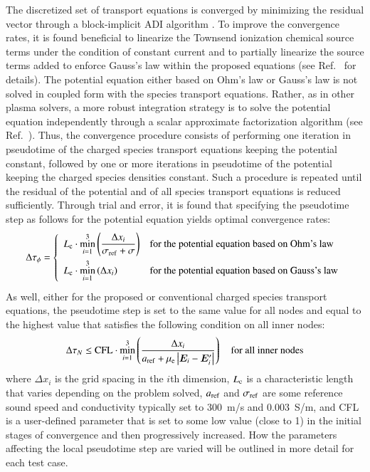 \documentclass[twoside,onecolumn,10pt]{waflarticle}
\renewcommand{\vec}[1]{\bm{#1}}
\newcommand{\alb}{\vspace{0.1cm}\\} %
\newcommand{\mfd}{\displaystyle}
\renewcommand{\vec}[1]{\bm{ #1 }}
\begin{document}
The discretized set of transport equations is converged by minimizing the residual vector through a block-implicit ADI algorithm \cite{jcp:1980:briley}. To improve the convergence rates, it is found beneficial to linearize the Townsend ionization chemical source terms under the condition of constant current and to partially linearize the source terms added to enforce Gauss's law within the proposed equations   (see Ref.\ \cite{jcp:2014:parent} for details).  The potential equation either based on Ohm's law or Gauss's law is not solved in coupled form with the species transport equations. Rather, as in other plasma solvers, a more robust integration strategy is to solve the potential equation independently through a scalar approximate factorization algorithm (see Ref.\ \cite{jcp:2011:parent}). Thus, the convergence procedure consists of performing one iteration in pseudotime of the charged species transport equations keeping the potential constant, followed by one or more iterations  in pseudotime of the potential keeping the charged species densities constant. Such a procedure is repeated until the residual of the potential and of all species transport equations is reduced sufficiently. Through trial and error, it is found that specifying the pseudotime step as follows for the potential equation yields optimal convergence rates:
%
\begin{equation}
\Delta \tau_\phi = \left\{ 
\begin{array}{ll}
\mfd L_{\rm c}\cdot \raisebox{-1.5ex}{$\stackrel{\stackrel{\scriptstyle 3}{\textstyle \rm min}}{\scriptstyle i=1}$} \left(\frac{\Delta x_i}{\sigma_{\rm ref}+\sigma}\right) & \textrm{for the potential equation based on Ohm's law} \alb
\mfd L_{\rm c}\cdot \raisebox{-1.5ex}{$\stackrel{\stackrel{\scriptstyle 3}{\textstyle \rm min}}{\scriptstyle i=1}$} \left({\Delta x_i}\right) & \textrm{for the potential equation  based on Gauss's law} \alb
\end{array}
\right.
\end{equation}
%
As well, either for the proposed or conventional charged species transport equations, the pseudotime step is set to the same value for all nodes and equal to the highest value that satisfies the following condition on all inner nodes: 
%
\begin{equation}
\Delta \tau_N \le {\rm CFL}\cdot \raisebox{-1.5ex}{$\stackrel{\stackrel{\scriptstyle 3}{\textstyle \rm min}}{\scriptstyle i=1}$} \left(\mfd\frac{\Delta x_i}{a_{\rm ref}+\mu_{\rm e} \left|\vec{E}_i-\vec{E}^\prime_i\right|}\right)~~~~\textrm{for all inner nodes}
\end{equation}
%
where $\Delta x_i$ is the grid spacing in the $i$th dimension, $L_{\rm c}$ is a characteristic length that varies depending on the problem solved, $a_{\rm ref}$ and $\sigma_{\rm ref}$ are some reference sound speed and conductivity typically set to 300~m/s and 0.003~S/m, and CFL is a user-defined parameter that is set to some low value (close to 1) in the initial stages of convergence and then progressively increased. How the parameters affecting the local pseudotime step are varied will be outlined in more detail for each test case.
\end{document}
